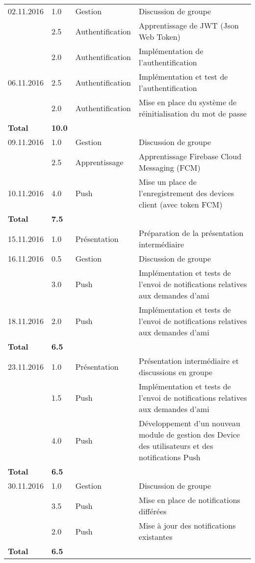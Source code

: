 \documentclass[french]{article}
\begin{document}
\begin{longtable}{p{}|p{}|p{}|p{}}
		\hline
		02.11.2016 & 1.0 & Gestion & Discussion de groupe \\
			       & 2.5 & Authentification & Apprentissage de JWT (Json Web Token) \\
  			       & 2.0 & Authentification & Implémentation de l'authentification \\
		06.11.2016 & 2.5 & Authentification & Implémentation et test de l'authentification \\
				   & 2.0 & Authentification & Mise en place du système de réinitialisation du mot de passe \\
		\textbf{Total} & \textbf{10.0} && \\

		\hline
		09.11.2016 & 1.0 & Gestion & Discussion de groupe \\
		           & 2.5 & Apprentissage & Apprentissage Firebase Cloud Messaging (FCM) \\
		10.11.2016 & 4.0 & Push & Mise un place de l'enregistrement des devices client (avec token FCM) \\
		\textbf{Total} & \textbf{7.5} && \\

		\hline
		15.11.2016 & 1.0 & Présentation & Préparation de la présentation intermédiaire \\
		16.11.2016 & 0.5 & Gestion & Discussion de groupe \\
				   & 3.0 & Push & Implémentation et tests de l'envoi de notifications relatives aux demandes d'ami \\
		18.11.2016 & 2.0 & Push & Implémentation et tests de l'envoi de notifications relatives aux demandes d'ami \\
		\textbf{Total} & \textbf{6.5} && \\

		\hline
		23.11.2016 & 1.0 & Présentation & Présentation intermédiaire et discussions en groupe \\
		           & 1.5 & Push & Implémentation et tests de l'envoi de notifications relatives aux demandes d'ami \\
		           & 4.0 & Push & Développement d'un nouveau module de gestion des Device des utilisateurs et des notifications Push \\
		\textbf{Total} & \textbf{6.5} && \\

		\hline
		30.11.2016 & 1.0 & Gestion & Discussion de groupe \\
				   & 3.5 & Push & Mise en place de notifications différées  \\
				   & 2.0 & Push & Mise à jour des notifications existantes \\
		\textbf{Total} & \textbf{6.5} && \\


\end{longtable}
\end{document}
